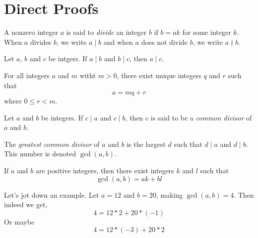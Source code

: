 \chapter{Direct Proofs}

\begin{definition}
	\label{div}
	A nonzero integer $a$ is said to \emph{divide} an integer $b$ if $b = ak$ for some integer $k$. When $a$ divides $b$, we write $a \mid b$ and when $a$ does not divide $b$, we write $a \nmid b$.
\end{definition}

\begin{proposition} \label{transdiv}
	Let $a$, $b$ and $c$ be intgers. If $a \mid b$ and $b \mid c$, then $a \mid c$.
\end{proposition}

\begin{theorem} \label{divalgo}
	For all integers $a$ and $m$ witht $m > 0$, there exist unique integers $q$ and $r$ such that
	$$a = mq+r$$
	where $0 \leq r < m$.
\end{theorem}

\begin{definition} \label{gcd}
	Let $a$ and $b$ be integers. If $c \mid a$ and $c \mid b$, then $c$ is said to be a \emph{common divisor} of $a$ and $b$.

	The \emph{greatest common divisor} of $a$ and $b$ is the largest $d$ such that $d \mid a$ and $d \mid b$. This number is denoted $\gcd(a,b)$.
\end{definition}

\begin{theorem} \label{gcdalgo}
	If $a$ and $b$ are positive integers, then there exist integers $k$ and $l$ such that $$\gcd(a,b) = ak + bl$$
\end{theorem}

\begin{scratch}
	Let's jot down an example. Let $a = 12$ and $b = 20$, making $\gcd(a, b) = 4$.
	Then indeed we get, $$4 = 12*2 + 20*(-1)$$
	Or maybe $$4 = 12*(-3) + 20*2$$
\end{scratch}

